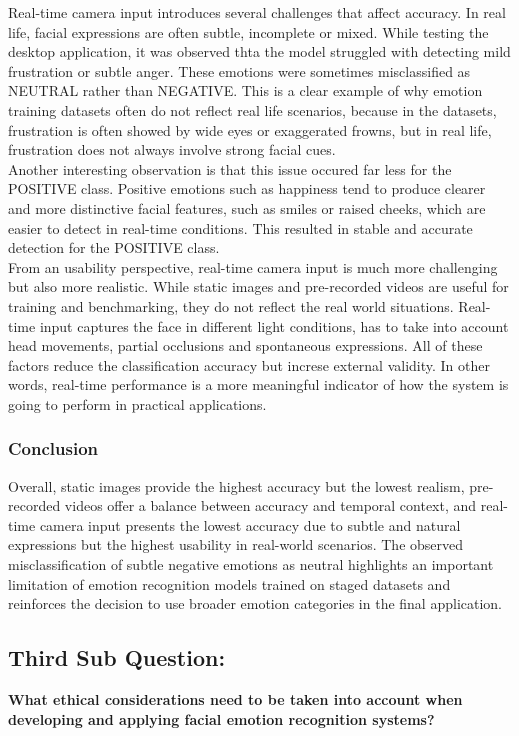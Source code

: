 \documentclass[12pt,a4paper]{article}
\begin{document}
Real-time camera input introduces several challenges that affect accuracy. In real life, facial expressions are often subtle, incomplete or mixed. While testing the desktop application, it was observed thta the model struggled with detecting mild frustration or subtle anger. These emotions were sometimes misclassified as NEUTRAL rather than NEGATIVE. This is a clear example of why emotion training datasets often do not reflect real life scenarios, because in the datasets, frustration is often showed by wide eyes or exaggerated frowns, but in real life, frustration does not always involve strong facial cues.\\
Another interesting observation is that this issue occured far less for the POSITIVE class. Positive emotions such as happiness tend to produce clearer and more distinctive facial features, such as smiles or raised cheeks, which are easier to detect in real-time conditions. This resulted in stable and accurate detection for the POSITIVE class.\\
From an usability perspective, real-time camera input is much more challenging but also more realistic. While static images and pre-recorded videos are useful for training and benchmarking, they do not reflect the real world situations. Real-time input captures the face in different light conditions, has to take into account head movements, partial occlusions and spontaneous expressions. All of these factors reduce the classification accuracy but increse external validity. In other words, real-time performance is a more meaningful indicator of how the system is going to perform in practical applications.\\
\subsubsection*{Conclusion}
Overall, static images provide the highest accuracy but the lowest realism, pre-recorded videos offer a balance between accuracy and temporal context, and real-time camera input presents the lowest accuracy due to subtle and natural expressions but the highest usability in real-world scenarios. The observed misclassification of subtle negative emotions as neutral highlights an important limitation of emotion recognition models trained on staged datasets and reinforces the decision to use broader emotion categories in the final application.

\subsection{Third Sub Question:}
\textbf{What ethical considerations need to be taken into account when developing and applying facial emotion recognition systems?}
\end{document}

